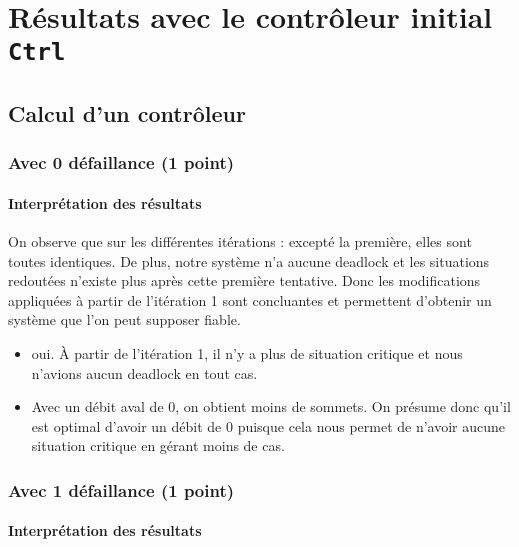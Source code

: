 \documentclass[a4paper]{book}
\begin{document}
\section{Résultats avec le contrôleur initial {\tt Ctrl}}

\subsection{Calcul d'un contrôleur}

\subsubsection{Avec 0 défaillance (1 point)}





\paragraph{Interprétation des résultats}

On observe que sur les différentes itérations : excepté la première, elles sont toutes identiques. De plus, notre système n'a aucune deadlock et les situations redoutées n'existe plus après cette première tentative. Donc les modifications appliquées à partir de l'itération 1 sont concluantes et permettent d'obtenir un système que l'on peut supposer fiable.
\begin{itemize}
	\item oui. À partir de l'itération 1, il n'y a plus de situation critique et nous n'avions aucun deadlock en tout cas. 
	\item Avec un débit aval de 0, on obtient moins de sommets. On présume donc qu'il est optimal d'avoir un débit de 0 puisque cela nous permet de n'avoir aucune situation critique en gérant moins de cas.

\end{itemize}
\subsubsection{Avec 1 défaillance (1 point)}





\paragraph{Interprétation des résultats}
\end{document}
